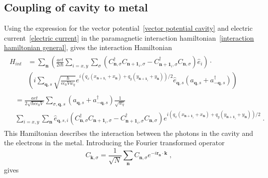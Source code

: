 \documentclass{article}
\begin{document}
\subsection{Coupling of cavity to metal}
Using the expression for the vector potential~\cref{vector potential cavity} and electric current~\cref{electric current} in the paramagnetic interaction hamiltonian~\cref{interaction hamiltonian general}, gives the interaction Hamiltonian
\begin{align*}
    \begin{split}
    H_{int} &= \sum_{\textbf{n}} \left(\frac{aet}{2i\hbar} \sum_{i=x,y}\sum_{\sigma} (C_{\textbf{n},\sigma}^{\dagger} C_{\textbf{n} + \textbf{1}_i,\sigma} - C_{\textbf{n} + \textbf{1}_i,\sigma}^{\dagger} C_{\textbf{n},\sigma})\hat{e}_i\right) \cdot \\     
            &\left(i \sum_{\textbf{q},s} \sqrt{\frac{\hbar}{\epsilon \epsilon_0 V w_q}} e^{i\left(q_x \left(x_{\textbf{n} + \textbf{1}_i} + x_{\textbf{n}} \right) + q_y \left(y_{\textbf{n} + \textbf{1}_i} + y_{\textbf{n}} \right)\right)/2} \hat{e}_{\textbf{q},s}\left(a_{\textbf{q},s} + a_{-\textbf{q}, s}^{\dagger}\right)\right)
    \end{split}\\
    \begin{split}
            &= \frac{aet}{2\sqrt{\hbar \epsilon \epsilon_0 V} } \sum_{\sigma,\textbf{q},s} \left(a_{\textbf{q},s} + a_{-\textbf{q}, s}^{\dagger}\right) \frac{1}{\sqrt{w_q}} \\ 
            &  \sum_{i=x,y} \sum_{\textbf{n}} \hat{e}_{\textbf{q},s,i} (C_{\textbf{n},\sigma}^{\dagger} C_{\textbf{n} + \textbf{1}_i,\sigma} - C_{\textbf{n} + \textbf{1}_i,\sigma}^{\dagger} C_{\textbf{n},\sigma}) e^{i\left(q_x \left(x_{\textbf{n} + \textbf{1}_i} + x_{\textbf{n}} \right) + q_y \left(y_{\textbf{n} + \textbf{1}_i} + y_{\textbf{n}} \right)\right)/2}\;.
    \end{split}
     \label{interaction hamiltonian step 1}\textbf{}
\end{align*}
This Hamiltonian describes the interaction between the photons in the cavity and the electrons in the metal. Introducing the Fourier transformed operator
\begin{equation}
C_{\textbf{k},\sigma} = \frac{1}{\sqrt{N}} \sum_{\textbf{n}} C_{\textbf{n},\sigma} e^{-i\textbf{r}_{\textbf{n}} \cdot \textbf{k}}\;,
\label{fourier electron operator}
\end{equation}
gives
\end{document}
